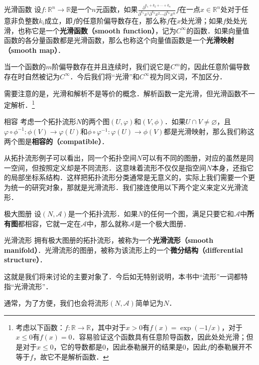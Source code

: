 \begin{definition}{光滑函数}
设$f:\mathbb{R}^n\rightarrow\mathbb{R}$是一个$n$元函数，如果$\frac{\partial^{k_1+k_2+\cdots+k_n}}{\partial^{k_1}x^1\partial^{k_2}x^2\cdots\partial^{k_n}x^n} f$在一点$x\in\mathbb{R}^n$处对于任意非负整数$k_i$成立，即$f$的任意阶偏导数存在，那么称$f$在$x$处光滑；如果$f$处处光滑，也称它是一个\textbf{光滑函数（smooth function）}，记为$C^\infty$的函数．如果向量值函数的各分量函数都是光滑函数，那么也称这个向量值函数是一个\textbf{光滑映射（smooth map）}．
\end{definition}

当一个函数的$m$阶偏导数存在并且连续时，我们说它是$C^m$的，因此任意阶偏导数存在时自然被记为$C^\infty$．今后我们将“光滑”和$C^\infty$视为同义词，不加区分．

需要注意的是，光滑和解析不是等价的概念．解析函数一定光滑，但光滑函数不一定解析．\footnote{考虑以下函数：$f:\mathbb{R}\rightarrow\mathbb{R}$，其中对于$x>0$有$f(x)=\exp(-1/x)$，对于$x\leq 0$有$f(x)=0$．容易验证这个函数具有任意阶导函数，因此处处光滑；但是对于$x\leq 0$，它的导数都是$0$，因此泰勒展开的结果是$0$，因此$f$的泰勒展开不等于$f$，故它不是解析函数．}

\begin{definition}{相容}
考虑一个拓扑流形$N$的两个图$(U, \varphi)$和$(V, \phi)$．如果$U\cap V\not=\varnothing$，且$\varphi\circ\phi^{-1}:\phi(V)\rightarrow\varphi(U)$和$\phi\circ\varphi^{-1}:\varphi(U)\rightarrow\phi(V)$都是光滑映射，那么我们称这两个图是\textbf{相容的（compatible）}．
\end{definition}

从拓扑流形例子可以看出，同一个拓扑空间$N$可以有不同的图册，对应的虽然是同一空间，但按照定义却是不同流形．这意味着流形不仅仅是指空间$N$本身，还指它的局部坐标系结构．这样把拓扑流形分类通常是无意义的，实际上我们需要一个更为统一的研究对象，那就是光滑流形．我们接连使用以下两个定义来定义光滑流形．

\begin{definition}{极大图册}
设$(N, \mathcal{A})$是一个拓扑流形．如果$N$的任何一个图，满足只要它和$\mathcal{A}$中\textbf{所有图}都相容，它就一定在$\mathcal{A}$中，那么就称$\mathcal{A}$是一个极大图册．
\end{definition}

\begin{definition}{光滑流形}
拥有极大图册的拓扑流形，被称为一个\textbf{光滑流形（smooth manifold）}．光滑流形的图册，被称为该流形上的一个\textbf{微分结构（differential structure）}．
\end{definition}

这就是我们将来讨论的主要对象了．今后如无特别说明，本书中“流形”一词都特指“光滑流形”．

通常，为了方便，我们也会将流形$(N, \mathcal{A})$简单记为$N$．





